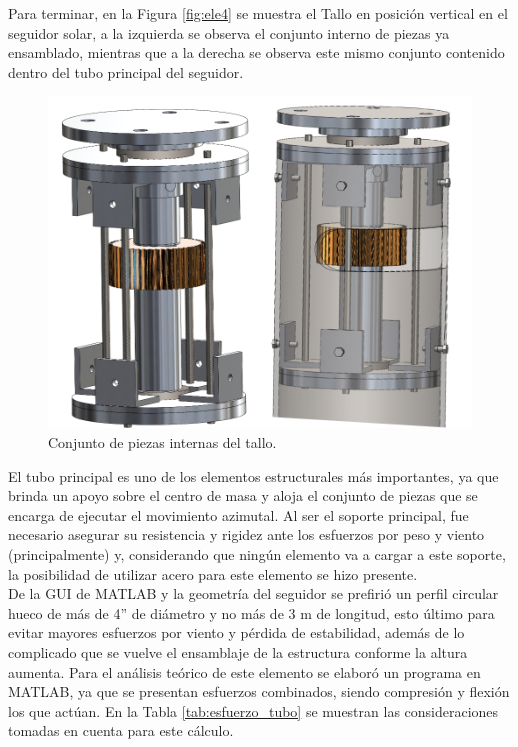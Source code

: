 \newpage
Para terminar, en la Figura \ref{fig:ele4} se muestra el Tallo en posición vertical en el seguidor solar, a la izquierda se observa el conjunto interno de piezas ya ensamblado, mientras que a la derecha se observa este mismo conjunto contenido dentro del tubo principal del seguidor.

\begin{figure}[H]
	\centering
	\includegraphics[width=12cm]{imagenes/tal4}
	\caption{Conjunto de piezas internas del tallo.}
	\label{fig:tal4}
\end{figure}

El tubo principal es uno de los elementos estructurales más importantes, ya que brinda un apoyo sobre el centro de masa y aloja el conjunto de piezas que se encarga de ejecutar el movimiento azimutal. Al ser el soporte principal, fue necesario asegurar su resistencia y rigidez ante los esfuerzos por peso y viento (principalmente) y, considerando que ningún elemento va a cargar a este soporte, la posibilidad de utilizar acero para este elemento se hizo presente.\\

De la GUI de MATLAB y la geometría del seguidor se prefirió un perfil circular hueco de más de 4” de diámetro y no más de 3 m de longitud, esto último para evitar mayores esfuerzos por viento y pérdida de estabilidad, además de lo complicado que se vuelve el ensamblaje de la estructura conforme la altura aumenta. Para el análisis teórico de este elemento se elaboró un programa en MATLAB, ya que se presentan esfuerzos combinados, siendo compresión y flexión los que actúan. En la Tabla \ref{tab:esfuerzo_tubo} se muestran las consideraciones tomadas en cuenta para este cálculo.

